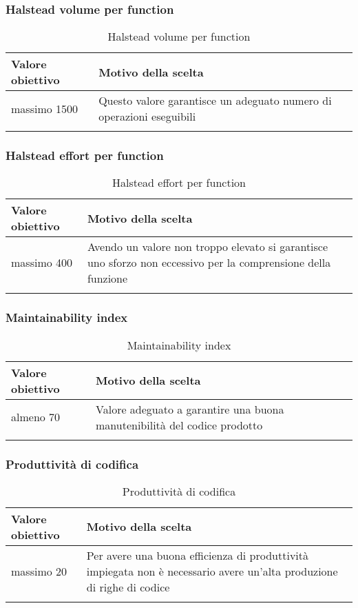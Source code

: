 \documentclass[../PianoDiQualifica_v4.0.0.tex]{subfiles}
\begin{document}
		\subsubsection{Halstead volume per function}
			\begin{longtable}[c] { >{\centering\arraybackslash}p{4cm} p{7cm} }
				\toprule
				\centerline{\textbf{Valore obiettivo}} & \centerline{\textbf{Motivo della scelta}} \\
				\midrule
					massimo 1500 & Questo valore garantisce un adeguato numero di operazioni eseguibili \\
				\bottomrule
				\caption{Halstead volume per function}
			\end{longtable}

		\subsubsection{Halstead effort per function}
			\begin{longtable}[c] { >{\centering\arraybackslash}p{4cm} p{7cm} }
				\toprule
				\centerline{\textbf{Valore obiettivo}} & \centerline{\textbf{Motivo della scelta}} \\
				\midrule
					massimo 400 & Avendo un valore non troppo elevato si garantisce uno sforzo non eccessivo per la comprensione della funzione \\
				\bottomrule
				\caption{Halstead effort per function}
			\end{longtable}

		\subsubsection{Maintainability index}
			\begin{longtable}[c] { >{\centering\arraybackslash}p{4cm} p{7cm} }
				\toprule
				\centerline{\textbf{Valore obiettivo}} & \centerline{\textbf{Motivo della scelta}} \\
				\midrule
					almeno 70 &	Valore adeguato a garantire una buona manutenibilità del codice prodotto \\
				\bottomrule
				\caption{Maintainability index}
			\end{longtable}

		\subsubsection{Produttività di codifica}
			\begin{longtable}[c] { >{\centering\arraybackslash}p{4cm} p{7cm} }
				\toprule
				\centerline{\textbf{Valore obiettivo}} & \centerline{\textbf{Motivo della scelta}} \\
				\midrule
					massimo 20 & Per avere una buona efficienza di produttività impiegata non è necessario avere un'alta produzione di righe di codice \\
				\bottomrule
				\caption{Produttività di codifica}
			\end{longtable}
\end{document}

